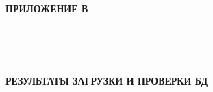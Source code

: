 \begin{ESKDtitlePage}
  \begin{flushright}
    \textbf{ПРИЛОЖЕНИЕ В} \enspace\enspace
  \end{flushright}
  
  \begin{center}
    \envDiplomEducation \\
    \envDiplomUniversity \\
    \envDiplomCathedra \\
  \end{center}

  \vfill

  \begin{center}
    \textbf{РЕЗУЛЬТАТЫ ЗАГРУЗКИ И ПРОВЕРКИ БД}
  \end{center}

  \vfill

  \begin{center}
    \envCode \\
  \end{center}

  \vfill

  

  \vfill

  \begin{center}
    \ESKDtheYear
  \end{center}
\end{ESKDtitlePage}
